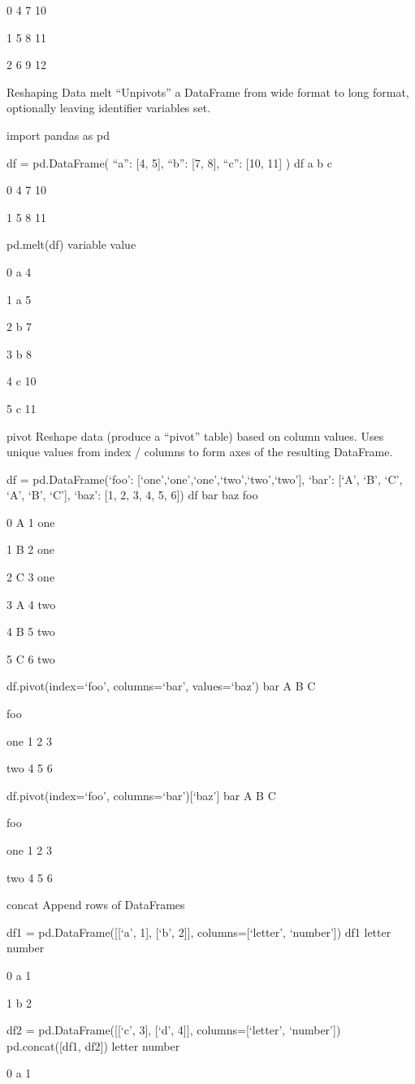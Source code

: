 0 4 7 10

1 5 8 11

2 6 9 12

Reshaping Data
melt
“Unpivots” a DataFrame from wide format to long format, optionally leaving identifier variables set.

import pandas as pd

df = pd.DataFrame({
“a”: [4, 5],
“b”: [7, 8],
“c”: [10, 11]
})
df
a b c

0 4 7 10

1 5 8 11

pd.melt(df)
variable value

0 a 4

1 a 5

2 b 7

3 b 8

4 c 10

5 c 11

pivot
Reshape data (produce a “pivot” table) based on column values. Uses unique values from index / columns to form axes of the resulting DataFrame.

df = pd.DataFrame({‘foo’: [‘one’,‘one’,‘one’,‘two’,‘two’,‘two’],
‘bar’: [‘A’, ‘B’, ‘C’, ‘A’, ‘B’, ‘C’],
‘baz’: [1, 2, 3, 4, 5, 6]})
df
bar baz foo

0 A 1 one

1 B 2 one

2 C 3 one

3 A 4 two

4 B 5 two

5 C 6 two

df.pivot(index=‘foo’, columns=‘bar’, values=‘baz’)
bar A B C

foo

one 1 2 3

two 4 5 6

df.pivot(index=‘foo’, columns=‘bar’)[‘baz’]
bar A B C

foo

one 1 2 3

two 4 5 6

concat
Append rows of DataFrames

df1 = pd.DataFrame([[‘a’, 1], [‘b’, 2]],
columns=[‘letter’, ‘number’])
df1
letter number

0 a 1

1 b 2

df2 = pd.DataFrame([[‘c’, 3], [‘d’, 4]],
columns=[‘letter’, ‘number’])
pd.concat([df1, df2])
letter number

0 a 1


